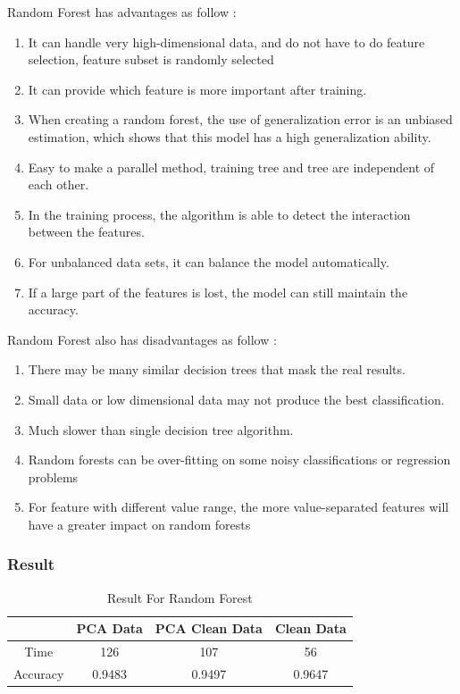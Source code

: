 \documentclass[sigconf]{acmart}
\begin{document}
Random Forest has advantages as follow \cite{RF}:
\begin{enumerate}
    \item It can handle very high-dimensional data, and do not have to do feature selection, feature subset is randomly selected
    \item It can provide which feature is more important after training.
    \item When creating a random forest, the use of generalization error is an unbiased estimation, which shows that this model has a high generalization ability.
    \item Easy to make a parallel method, training tree and tree are independent of each other.
    \item In the training process, the algorithm is able to detect the interaction between the features.
    \item For unbalanced data sets, it can balance the model automatically.
    \item If a large part of the features is lost, the model can still maintain the accuracy.
\end{enumerate}

Random Forest also has disadvantages as follow \cite{RF}:
\begin{enumerate}
    \item There may be many similar decision trees that mask the real results.
    \item Small data or low dimensional data may not produce the best classification.
    \item Much slower than single decision tree algorithm.
    \item Random forests can be over-fitting on some noisy classifications or regression problems
    \item For feature with different value range, the more value-separated features will have a greater impact on random forests
\end{enumerate}

\subsubsection{Result}

\begin{table}[htb]
    \centering
    \begin{tabular}{|c|c|c|c|} \hline
                 &  PCA Data & PCA Clean Data & Clean Data \\ \hline
        Time     &  126      & 107             & 56        \\
        Accuracy &  0.9483   & 0.9497          & 0.9647    \\ \hline
    \end{tabular}
    \caption{Result For Random Forest}
\end{table}
\end{document}

